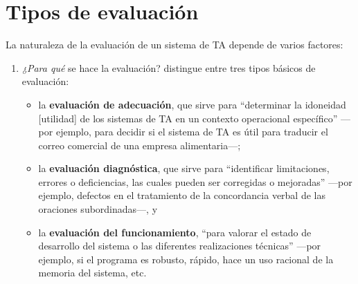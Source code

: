 \section{Tipos de evaluación} \label{ss:tipusaval} La naturaleza de la evaluación de un sistema de TA depende de varios factores: \begin{enumerate} \item \emph{¿Para qué} se hace la evaluación? \citet{hutchins96u} distingue entre tres tipos básicos de evaluación: \begin{itemize} \item la \textbf{evaluación de adecuación}, que sirve para ``determinar la idoneidad [utilidad] de los sistemas de TA en un contexto operacional específico'' ---por ejemplo, para decidir si el sistema de TA es útil para traducir el correo comercial de una empresa alimentaria---; \item la \textbf{evaluación diagnóstica}, que sirve para ``identificar limitaciones, errores o deficiencias, las cuales pueden ser corregidas o mejoradas'' ---por ejemplo, defectos en el tratamiento de la concordancia verbal de las oraciones subordinadas---, y \item la  \textbf{evaluación del funcionamiento}, ``para valorar el estado de desarrollo del sistema o las diferentes realizaciones técnicas'' ---por ejemplo, si el programa es robusto, rápido, hace un uso racional de la memoria del sistema, etc. \end{itemize} 


\end{enumerate}

